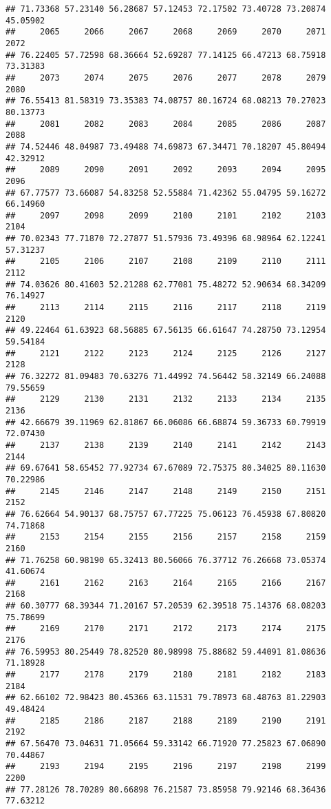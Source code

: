 \documentclass[
]{article}
\begin{document}
\begin{verbatim}
## 71.73368 57.23140 56.28687 57.12453 72.17502 73.40728 73.20874 45.05902 
##     2065     2066     2067     2068     2069     2070     2071     2072 
## 76.22405 57.72598 68.36664 52.69287 77.14125 66.47213 68.75918 73.31383 
##     2073     2074     2075     2076     2077     2078     2079     2080 
## 76.55413 81.58319 73.35383 74.08757 80.16724 68.08213 70.27023 80.13773 
##     2081     2082     2083     2084     2085     2086     2087     2088 
## 74.52446 48.04987 73.49488 74.69873 67.34471 70.18207 45.80494 42.32912 
##     2089     2090     2091     2092     2093     2094     2095     2096 
## 67.77577 73.66087 54.83258 52.55884 71.42362 55.04795 59.16272 66.14960 
##     2097     2098     2099     2100     2101     2102     2103     2104 
## 70.02343 77.71870 72.27877 51.57936 73.49396 68.98964 62.12241 57.31237 
##     2105     2106     2107     2108     2109     2110     2111     2112 
## 74.03626 80.41603 52.21288 62.77081 75.48272 52.90634 68.34209 76.14927 
##     2113     2114     2115     2116     2117     2118     2119     2120 
## 49.22464 61.63923 68.56885 67.56135 66.61647 74.28750 73.12954 59.54184 
##     2121     2122     2123     2124     2125     2126     2127     2128 
## 76.32272 81.09483 70.63276 71.44992 74.56442 58.32149 66.24088 79.55659 
##     2129     2130     2131     2132     2133     2134     2135     2136 
## 42.66679 39.11969 62.81867 66.06086 66.68874 59.36733 60.79919 72.07430 
##     2137     2138     2139     2140     2141     2142     2143     2144 
## 69.67641 58.65452 77.92734 67.67089 72.75375 80.34025 80.11630 70.22986 
##     2145     2146     2147     2148     2149     2150     2151     2152 
## 76.62664 54.90137 68.75757 67.77225 75.06123 76.45938 67.80820 74.71868 
##     2153     2154     2155     2156     2157     2158     2159     2160 
## 71.76258 60.98190 65.32413 80.56066 76.37712 76.26668 73.05374 41.60674 
##     2161     2162     2163     2164     2165     2166     2167     2168 
## 60.30777 68.39344 71.20167 57.20539 62.39518 75.14376 68.08203 75.78699 
##     2169     2170     2171     2172     2173     2174     2175     2176 
## 76.59953 80.25449 78.82520 80.98998 75.88682 59.44091 81.08636 71.18928 
##     2177     2178     2179     2180     2181     2182     2183     2184 
## 62.66102 72.98423 80.45366 63.11531 79.78973 68.48763 81.22903 49.48424 
##     2185     2186     2187     2188     2189     2190     2191     2192 
## 67.56470 73.04631 71.05664 59.33142 66.71920 77.25823 67.06890 70.44867 
##     2193     2194     2195     2196     2197     2198     2199     2200 
## 77.28126 78.70289 80.66898 76.21587 73.85958 79.92146 68.36436 77.63212 

\end{verbatim}
\end{document}
